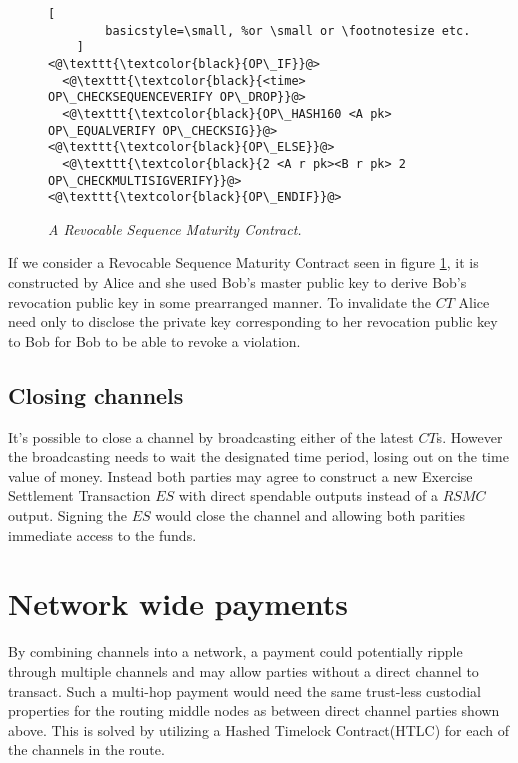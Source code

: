 \begin{figure}[hbt!]
	\centering
	\begin{lstlisting}[
		basicstyle=\small, %or \small or \footnotesize etc.
	]
<@\texttt{\textcolor{black}{OP\_IF}}@>
  <@\texttt{\textcolor{black}{<time> OP\_CHECKSEQUENCEVERIFY OP\_DROP}}@>
  <@\texttt{\textcolor{black}{OP\_HASH160 <A pk> OP\_EQUALVERIFY OP\_CHECKSIG}}@>
<@\texttt{\textcolor{black}{OP\_ELSE}}@>
  <@\texttt{\textcolor{black}{2 <A r pk><B r pk> 2 OP\_CHECKMULTISIGVERIFY}}@>
<@\texttt{\textcolor{black}{OP\_ENDIF}}@>
	\end{lstlisting}
	
	\caption{\textit{ A Revocable Sequence Maturity Contract.
	}}
	\label{fig:RSMC}
\end{figure}

If we consider a Revocable Sequence Maturity Contract seen in figure \ref{fig:RSMC}, it is constructed by Alice and she used Bob's master public key to derive Bob's revocation public key in some prearranged manner. To invalidate the $CT$ Alice need only to disclose the private key corresponding to her revocation public key to Bob for Bob to be able to revoke a violation. 

\subsection{Closing channels}

It's possible to close a channel by broadcasting either of the latest $CT$s. However the broadcasting needs to wait the designated time period, losing out on the time value of money. Instead both parties may agree to construct a new Exercise Settlement Transaction $ES$ with direct spendable outputs instead of a $RSMC$ output. Signing the $ES$ would close the channel and allowing both parities immediate access to the funds.

\section{Network wide payments}

By combining channels into a network, a payment could potentially ripple through multiple channels and may allow parties without a direct channel to transact. Such a multi-hop payment would need the same trust-less custodial properties for the routing middle nodes as between direct channel parties shown above. This is solved by utilizing a Hashed Timelock Contract(HTLC) for each of the channels in the route.

